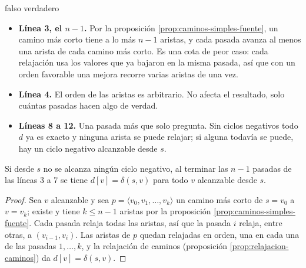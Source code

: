 \documentclass[11pt,letterpaper]{article}
\begin{document}
\begin{algorithm}[H]
\caption{\textsc{Bellman-Ford}$(G, w, s)$}
\label{alg:bellman-ford}
\begin{algorithmic}[1]
  \State {}
   
      \State {}
    \EndFor
  \EndFor
   
      \State \Return falso 
    \EndIf
  \EndFor
  \State \Return verdadero
\EndProcedure
\end{algorithmic}
\end{algorithm}

\begin{itemize}[itemsep=0.1em]
  \item \textbf{Línea 3, el $n - 1$.} Por la proposición
        \ref{prop:caminos-simples-fuente}, un camino más corto tiene a
        lo más $n - 1$ aristas, y cada pasada avanza al menos una
        arista de cada camino más corto. Es una cota de peor caso:
        cada relajación usa los valores que ya bajaron en la misma
        pasada, así que con un orden favorable una mejora recorre
        varias aristas de una vez.
  \item \textbf{Línea 4.} El orden de las aristas es arbitrario. No
        afecta el resultado, solo cuántas pasadas hacen algo de
        verdad.
  \item \textbf{Líneas 8 a 12.} Una pasada más que solo pregunta. Sin
        ciclos negativos todo $d$ ya es exacto y ninguna arista se
        puede relajar; si alguna todavía se puede, hay un ciclo
        negativo alcanzable desde $s$.
\end{itemize}

\begin{lema}\label{lem:bellman-ford-pasadas}
  Si desde $s$ no se alcanza ningún ciclo negativo, al terminar las
  $n - 1$ pasadas de las líneas 3 a 7 se tiene $d[v] = \delta(s, v)$
  para todo $v$ alcanzable desde $s$.
\end{lema}

\begin{proof}
  Sea $v$ alcanzable y sea $p = \langle v_0, v_1, \dots, v_k\rangle$
  un camino más corto de $s = v_0$ a $v = v_k$; existe y tiene
  $k \le n - 1$ aristas por la proposición
  \ref{prop:caminos-simples-fuente}. Cada pasada relaja todas las
  aristas, así que la pasada $i$ relaja, entre otras, a
  $(v_{i-1}, v_i)$. Las aristas de $p$ quedan relajadas en orden, una
  en cada una de las pasadas $1, \dots, k$, y la relajación de caminos
  (proposición \ref{prop:relajacion-caminos}) da
  $d[v] = \delta(s, v)$.
\end{proof}
\end{document}
